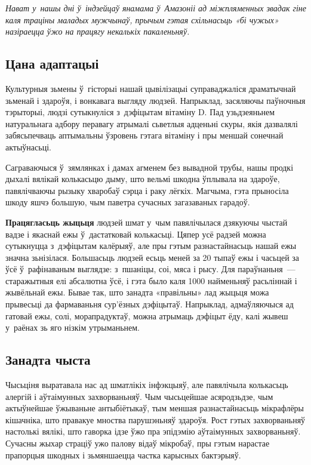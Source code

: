 \emph{Нават у~нашы дні ў~індзейцаў янамама ў~Амазоніі ад міжпляменных звадак гіне каля траціны маладых мужчынаў, прычым гэтая схільнасьць «бі чужых» назіраецца ўжо на працягу некалькіх пакаленьняў.}

\subsection*{Цана адаптацыі}

Культурныя зьмены ў~гісторыі нашай цывілізацыі суправаджаліся драматычнай зьменай і здароўя, і вонкавага выгляду людзей. Напрыклад, засяляючы паўночныя тэрыторыі, людзі сутыкнуліся з~дэфіцытам вітаміну D. Пад узьдзеяньнем натуральнага адбору перавагу атрымалі сьветлыя адценьні скуры, якія дазвалялі забясьпечваць аптымальны ўзровень гэтага вітаміну і пры меншай сонечнай актыўнасьці. 

Саграваючыся ў~зямлянках і дамах агменем без вывадной трубы, нашы продкі дыхалі вялікай колькасьцю дыму, што вельмі шкодна ўплывала на здароўе, павялічваючы рызыку хваробаў сэрца і раку лёгкіх. Магчыма, гэта прыносіла шкоду яшчэ большую, чым паветра сучасных загазаваных гарадоў.

\textbf{Працягласьць жыцьця} людзей шмат у~чым павялічылася дзякуючы чыстай вадзе і якаснай ежы ў~дастатковай колькасьці. Цяпер усё радзей можна сутыкнуцца з~дэфіцытам калёрыяў, але пры гэтым разнастайнасьць нашай ежы значна зьнізілася. Большасьць людзей есьць меней за 20 тыпаў ежы і часьцей за ўсё ў~рафінаваным выглядзе: з~пшаніцы, соі, мяса і рысу. Для параўнаньня~--- старажытныя елі абсалютна ўсё, і гэта было каля 1000 найменьняў расьліннай і жывёльнай ежы. Бывае так, што занадта «правільны» лад жыцьця можа прывесьці да фармаваньня сур'ёзных дэфіцытаў. Напрыклад, адмаўляючыся ад гатовай ежы, солі, морапрадуктаў, можна атрымаць дэфіцыт ёду, калі жывеш у~раёнах зь яго нізкім утрыманьнем.

\subsection*{Занадта чыста} 

Чысьціня выратавала нас ад шматлікіх інфэкцыяў, але павялічыла колькасьць алергій і аўтаімунных захворваньняў. Чым чысьцейшае асяродзьдзе, чым актыўнейшае ўжываньне антыбіётыкаў, тым меншая разнастайнасьць мікрафлёры кішачніка, што правакуе мноства парушэньняў здароўя. Рост гэтых захворваньняў настолькі вялікі, што гаворка ідзе ўжо пра эпідэмію аўтаімунных захворваньняў. Сучасны жыхар страціў ужо палову відаў мікробаў, пры гэтым нарастае прапорцыя шкодных і зьмяншаецца частка карысных бактэрыяў.

